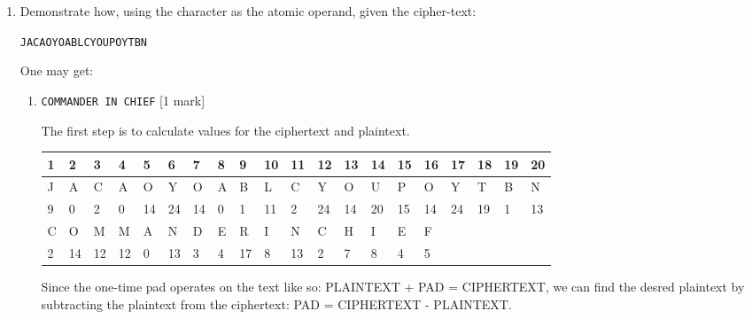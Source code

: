 \documentclass[12pt,emtex]{article}
\begin{document}
\begin{enumerate}
 \item Demonstrate how, using the character as the atomic operand, given the cipher-text:
 
\texttt{JACAOYOABLCYOUPOYTBN}
 
 One may get:
 
 
\begin{enumerate}
\item \texttt{COMMANDER IN CHIEF} 	 \hfill [1 mark]

\bigskip

The first step is to calculate values for the ciphertext and plaintext.

\begin{table}[h]
  \begin{tabular}{|l|l|l|l|l|l|l|l|l|l|l|l|l|l|l|l|l|l|l|l|}
  \hline
  1 & 2  & 3  & 4  & 5  & 6  & 7  & 8 & 9  & 10 & 11 & 12 & 13 & 14 & 15 & 16 & 17 & 18 & 19 & 20 \\ \hline
  J & A  & C  & A  & O  & Y  & O  & A & B  & L  & C  & Y  & O  & U  & P  & O  & Y  & T  & B  & N  \\ \hline
  9 & 0  & 2  & 0  & 14 & 24 & 14 & 0 & 1  & 11 & 2  & 24 & 14 & 20 & 15 & 14 & 24 & 19 & 1  & 13 \\ \hline
  C & O  & M  & M  & A  & N  & D  & E & R  & I  & N  & C  & H  & I  & E  & F  &    &    &    &    \\ \hline
  2 & 14 & 12 & 12 & 0  & 13 & 3  & 4 & 17 & 8  & 13 & 2  & 7  & 8  & 4  & 5  &    &    &    &    \\ \hline
  \end{tabular}
  \end{table}

Since the one-time pad operates on the text like so: PLAINTEXT + PAD = CIPHERTEXT, we can find the desred plaintext by
subtracting the plaintext from the ciphertext: PAD = CIPHERTEXT - PLAINTEXT.


\end{enumerate}
\end{enumerate}
\end{document}
